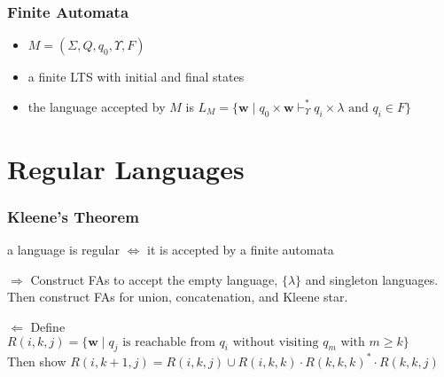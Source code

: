 \documentclass{beamer}
\begin{document}

\begin{frame}
\frametitle{Finite Automata}
\begin{itemize}
\item $M = (\Sigma, Q, q_0, \Upsilon, F)$
\item a finite LTS with initial and final states
\item the language accepted by $M$ is $L_M = \{\mathbf{w} \; | \; q_0 \times
  \mathbf{w} \vdash_{\Upsilon}^* q_i \times \lambda \text{ and } q_i \in F\}$
\end{itemize}
\end{frame}


\section{Regular Languages}


\begin{frame}
\frametitle{Kleene's Theorem}
\begin{theorem}
  a language is regular $\iff$ it is accepted by a finite automata
\end{theorem}
\begin{block}{$\Rightarrow$}
Construct FAs to accept the empty language, $\{\lambda\}$ and singleton
languages. Then construct FAs for union, concatenation, and Kleene star.
\end{block}

\begin{block}{$\Leftarrow$}
Define $R(i, k, j) = \{\mathbf{w} \; | \; q_j \text{ is reachable from } q_i
\text{ without visiting } q_m \text{ with } m \geq k\}$\\

Then show $R(i, k+1, j) = R(i, k, j) \cup R(i, k, k) \cdot R(k, k, k)^* \cdot
R(k, k, j)$
\end{block}
\end{frame}
\end{document}
